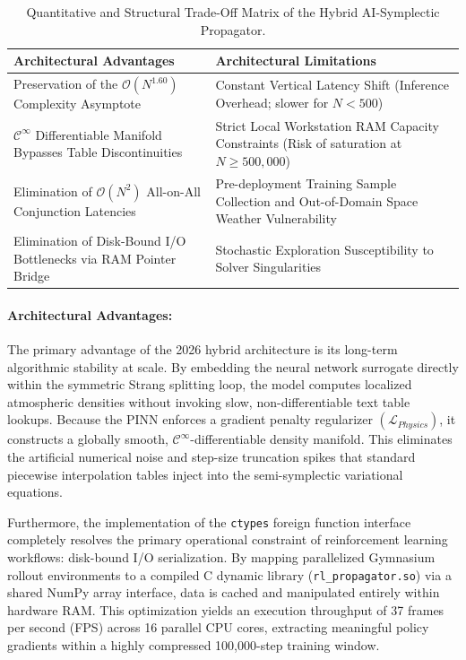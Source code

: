 \documentclass[letterpaper,11pt]{AAS}
\begin{document}
\begin{table}[hbt!]
    \centering
    \caption{Quantitative and Structural Trade-Off Matrix of the Hybrid AI-Symplectic Propagator.}
    \label{tab:pros_cons_tradeoffs}
    \begin{tabular}{p{} p{}}
        \toprule
        \textbf{Architectural Advantages} & \textbf{Architectural Limitations} \\
        \midrule
        Preservation of the $\mathcal{O}(N^{1.60})$ Complexity Asymptote & Constant Vertical Latency Shift (Inference Overhead; slower for $N < 500$) \\ \addlinespace
        $\mathcal{C}^\infty$ Differentiable Manifold Bypasses Table Discontinuities & Strict Local Workstation RAM Capacity Constraints (Risk of saturation at $N \ge 500,000$) \\ \addlinespace
        Elimination of $\mathcal{O}(N^2)$ All-on-All Conjunction Latencies & Pre-deployment Training Sample Collection and Out-of-Domain Space Weather Vulnerability \\ \addlinespace
        Elimination of Disk-Bound I/O Bottlenecks via RAM Pointer Bridge & Stochastic Exploration Susceptibility to Solver Singularities \\
        \bottomrule
    \end{tabular}
\end{table}

\paragraph{Architectural Advantages:}
The primary advantage of the 2026 hybrid architecture is its long-term algorithmic stability at scale. By embedding the neural network surrogate directly within the symmetric Strang splitting loop, the model computes localized atmospheric densities without invoking slow, non-differentiable text table lookups. Because the PINN enforces a gradient penalty regularizer $(\mathcal{L}_{Physics})$, it constructs a globally smooth, $\mathcal{C}^\infty$-differentiable density manifold. This eliminates the artificial numerical noise and step-size truncation spikes that standard piecewise interpolation tables inject into the semi-symplectic variational equations. 

Furthermore, the implementation of the \texttt{ctypes} foreign function interface completely resolves the primary operational constraint of reinforcement learning workflows: disk-bound I/O serialization. By mapping parallelized Gymnasium rollout environments to a compiled C dynamic library (\texttt{rl\_propagator.so}) via a shared NumPy array interface, data is cached and manipulated entirely within hardware RAM. This optimization yields an execution throughput of 37 frames per second (FPS) across 16 parallel CPU cores, extracting meaningful policy gradients within a highly compressed 100,000-step training window.
\end{document}
